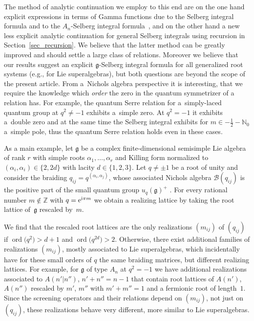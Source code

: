 \documentclass[pdftex]{sigma}%
\numberwithin{equation}{section}
\newcommand{\N}{\mathbb{N}}
\newcommand{\Z}{\mathbb{Z}}
\newcommand{\g}{\mathfrak{g}}
\begin{document}
The method of analytic continuation we employ to this end are on the one hand explicit expressions in terms of Gamma functions due to the Selberg integral formula and to the $A_n$-Selberg integral formula~\cite{TV03,War09}, and on the other hand a new less explicit analytic continuation for general Selberg integrals using recursion in Section~\ref{sec_recursion}. We believe that the latter method can be greatly improved and should settle a large class of relations. Moreover we believe that our results suggest an explicit $\g$-Selberg integral formula for all generalized root systems (e.g., for Lie superalgebras), but both questions are beyond the scope of the present article. From a~Nichols algebra perspective it is interesting, that we require the knowledge which \emph{order} the zero in the quantum symmetrizer of a relation has. For example, the quantum Serre relation for a~simply-laced quantum group at $q^2\neq -1$ exhibits a~simple zero. At $q^2=-1$ it exhibits a~double zero and at the same time the Selberg integral exhibits for $m\in -\frac{1}{2}-\N_0$ a~simple pole, thus the quantum Serre relation holds even in these cases.

As a main example, let $\mathfrak{g}$ be a complex finite-dimensional semisimple Lie algebra of rank $r$ with simple roots $\alpha_1, \dots, \alpha_r$ and Killing form normalized to $(\alpha_i,\alpha_i)\in\{2,2d\}$ with lacity $d\in\{1,2,3\}$. Let $q\neq \pm1$ be a root of unity and consider the braiding $q_{ij} = q^{(\alpha_i, \alpha_j)}$, whose associated Nichols algebra $\mathcal{B}(q_{ij})$ is the positive part of the small quantum group $u_q(\mathfrak{g})^+$ \cite{AS10, Lusz93,Rosso98}. For every rational number $m\not\in \Z$ with $q= {\rm e}^{{\rm i} \pi m}$ we obtain a realizing lattice by taking the root lattice of~$\mathfrak{g}$ rescaled by~$m$.

We find that the rescaled root lattices are the only realizations $(m_{ij})$ of $(q_{ij})$ if $\operatorname{ord}\big(q^2\big)>d+1$ and $\operatorname{ord}\big(q^{2d}\big)>2$. Otherwise, there exist additional families of realizations $(m_{ij})$, mostly associated to Lie superalgebras, which incidentally have for these small orders of $q$ the same braiding matrices, but different realizing lattices. For example, for $\g$ of type $A_{n}$ at $q^2=-1$ we have additional realizations associated to $A(n'\vert n'')$, $n'+n''=n-1$ that contain root lattices of $A(n')$, $A(n'')$ rescaled by $m'$, $m''$ with $m'+m''=1$ and a fermionic root of length~$1$. Since the screening operators and their relations depend on $(m_{ij})$, not just on $(q_{ij})$, these realizations behave very different, more similar to Lie superalgebras.
\end{document}
